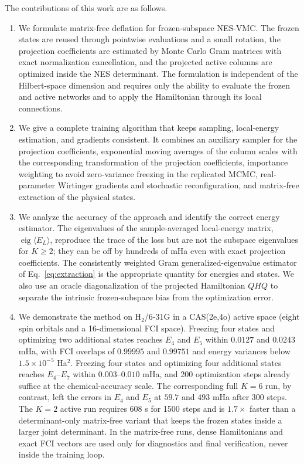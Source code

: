 \documentclass[11pt,a4paper]{article}
\begin{document}
The contributions of this work are as follows.
\begin{enumerate}
\item We formulate matrix-free deflation for frozen-subspace NES-VMC. The frozen states are reused through pointwise evaluations and a small rotation, the projection coefficients are estimated by Monte Carlo Gram matrices with exact normalization cancellation, and the projected active columns are optimized inside the NES determinant. The formulation is independent of the Hilbert-space dimension and requires only the ability to evaluate the frozen and active networks and to apply the Hamiltonian through its local connections.
\item We give a complete training algorithm that keeps sampling, local-energy estimation, and gradients consistent. It combines an auxiliary sampler for the projection coefficients, exponential moving averages of the column scales with the corresponding transformation of the projection coefficients, importance weighting to avoid zero-variance freezing in the replicated MCMC, real-parameter Wirtinger gradients and stochastic reconfiguration, and matrix-free extraction of the physical states.
\item We analyze the accuracy of the approach and identify the correct energy estimator. The eigenvalues of the sample-averaged local-energy matrix, $\operatorname{eig}\langle E_L\rangle$, reproduce the trace of the loss but are not the subspace eigenvalues for $K\ge2$; they can be off by hundreds of mHa even with exact projection coefficients. The consistently weighted Gram generalized-eigenvalue estimator of Eq.~\eqref{eq:extraction} is the appropriate quantity for energies and states. We also use an oracle diagonalization of the projected Hamiltonian $QHQ$ to separate the intrinsic frozen-subspace bias from the optimization error.
\item We demonstrate the method on H$_2$/6-31G in a CAS(2e,4o) active space (eight spin orbitals and a 16-dimensional FCI space). Freezing four states and optimizing two additional states reaches $E_4$ and $E_5$ within $0.0127$ and $0.0243$ mHa, with FCI overlaps of $0.99995$ and $0.99751$ and energy variances below $1.5\times10^{-5}$ Ha$^2$. Freezing four states and optimizing four additional states reaches $E_4$--$E_7$ within $0.003$--$0.010$ mHa, and 200 optimization steps already suffice at the chemical-accuracy scale. The corresponding full $K=6$ run, by contrast, left the errors in $E_4$ and $E_5$ at $59.7$ and $493$ mHa after 300 steps. The $K=2$ active run requires $608$ s for 1500 steps and is $1.7\times$ faster than a determinant-only matrix-free variant that keeps the frozen states inside a larger joint determinant. In the matrix-free runs, dense Hamiltonians and exact FCI vectors are used only for diagnostics and final verification, never inside the training loop.

\end{enumerate}
\end{document}

